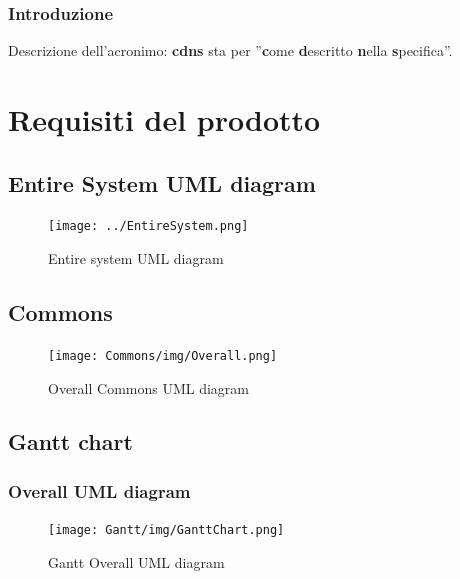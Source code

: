 \documentclass[a4paper, 12pt]{report}
\begin{document}
\tableofcontents

\newpage

\section*{Introduzione}
Descrizione dell'acronimo: \textbf{cdns} sta per ''\textbf{c}ome
\textbf{d}escritto \textbf{n}ella \textbf{s}pecifica''.

\part{Requisiti del prodotto}

\chapter*{Entire System UML diagram}
\begin{figure}[h!] \centering
\texttt{[image: ../EntireSystem.png]} 
\caption{Entire system UML diagram}
\label{fig:entireSystemDiagram}
\end{figure}

\chapter{Commons}
\begin{figure}[h!] \centering
\texttt{[image: Commons/img/Overall.png]} 
\caption{Overall Commons UML diagram}
\label{fig:commonsOverallDiagram}
\end{figure}














\chapter{Gantt chart}
\section*{Overall UML diagram}
\begin{figure}[h!] \centering
\texttt{[image: Gantt/img/GanttChart.png]} 
\caption{Gantt Overall UML diagram}
\label{fig:ganttDiagram}
\end{figure}
\end{document}
